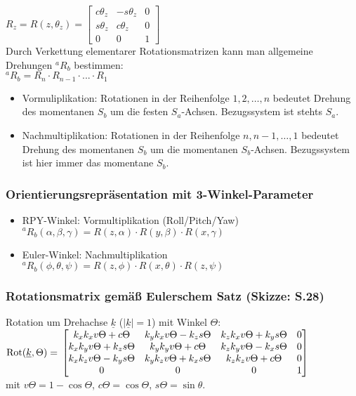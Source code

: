\documentclass[a4paper,landscape,6pt]{article}
\newcommand{\mat}[1]{\ensuremath{\begin{bmatrix} #1 \end{bmatrix}}}				%
\newcommand{\ul}[1]{\underline{#1}}
\begin{document}
\begin{multicols}{3}
$R_z = R(z,\theta_z) = \mat{c\theta_z & -s\theta_z & 0 \\ s\theta_z & c\theta_z & 0 \\ 0 & 0 & 1}$\\

Durch Verkettung elementarer Rotationsmatrizen kann man allgemeine Drehungen ${}^{a}{R}_b$ bestimmen:\\
${}^{a}{R}_b = R_n \cdot R_{n-1} \cdot ... \cdot R_1$
\begin{itemize}
	\item Vormuliplikation: Rotationen in der Reihenfolge $1,2,\dots,n$ bedeutet Drehung des momentanen $S_b$ um die festen $S_a$-Achsen. Bezugssystem ist stehts $S_a$.
	\item Nachmultiplikation: Rotationen in der Reihenfolge $n, n-1, \dots , 1$ bedeutet Drehung des momentanen $S_b$ um die momentanen $S_b$-Achsen. Bezugssystem ist hier immer das momentane $S_b$.
\end{itemize}
\subsubsection*{Orientierungsrepräsentation mit 3-Winkel-Parameter}
\begin{itemize}
	\item RPY-Winkel: Vormultiplikation (Roll/Pitch/Yaw)\\
	${}^{a}{R}_b(\alpha, \beta, \gamma) = R(z,\alpha) \cdot R(y,\beta) \cdot R(x,\gamma)$
	\item Euler-Winkel: Nachmultiplikation\\
	${}^{a}{R}_b(\phi, \theta, \psi) = R(z,\phi) \cdot R(x,\theta) \cdot R(z,\psi)$
\end{itemize}
\subsubsection*{Rotationsmatrix gemäß Eulerschem Satz \footnotesize{(Skizze: S.28)}}
Rotation um Drehachse $\ul k$ ($|\ul k| = 1$) mit Winkel $\Theta$:\\

$\text{Rot}(\ul k,\Theta) = \\\\
 \mat{k_x k_x v\Theta + c\Theta & k_y k_x v\Theta - k_z s\Theta & k_z k_x v\Theta + k_y s\Theta & 0 \\
	 k_x k_y v\Theta + k_z s\Theta & k_y k_y v\Theta + c\Theta & k_z k_y v\Theta - k_x s\Theta & 0 \\
	 k_x k_z v\Theta - k_y s\Theta & k_y k_z v\Theta + k_x s\Theta & k_z k_z v\Theta + c\Theta & 0 \\
     0 & 0 & 0 & 1 \\ }$\\
mit $v\Theta = 1-\cos \Theta$, $c\Theta = \cos \Theta$, $s\Theta = \sin \theta$.\\


\end{multicols}
\end{document}
